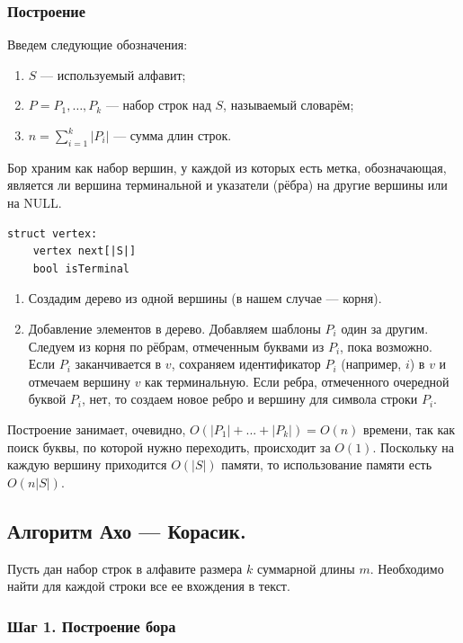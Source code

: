 \subsubsection{Построение}

Введем следующие обозначения:

\begin{enumerate}
    \item $S$ --- используемый алфавит;
    \item $P={P_1,…,P_k}$ --- набор строк над $S$, называемый словарём;
    \item $n = \sum_{i = 1}^k |P_i|$ --- сумма длин строк.
\end{enumerate}

Бор храним как набор вершин, у каждой из которых есть метка, обозначающая, является ли вершина терминальной и указатели (рёбра) на другие вершины или на NULL.

\begin{verbatim}
struct vertex:
    vertex next[|S|] 
    bool isTerminal
\end{verbatim}

\begin{enumerate}
    \item Создадим дерево из одной вершины (в нашем случае --- корня).
    \item Добавление элементов в дерево.
    Добавляем шаблоны $P_i$ один за другим.
    Следуем из корня по рёбрам, отмеченным буквами из $P_i$, пока возможно.
    Если $P_i$ заканчивается в $v$, сохраняем идентификатор $P_i$ (например, $i$) в $v$ и отмечаем вершину $v$ как терминальную.
    Если ребра, отмеченного очередной буквой $P_i$, нет, то создаем новое ребро и вершину для символа строки $P_i$.
\end{enumerate}

Построение занимает, очевидно, $O(|P_1|+...+|P_k|)=O(n)$ времени, так как поиск буквы, по которой нужно переходить, происходит за $O(1)$.
Поскольку на каждую вершину приходится $O(|S|)$ памяти, то использование памяти есть $O(n|S|)$. 

\subsection{Алгоритм Ахо --- Корасик.}

Пусть дан набор строк в алфавите размера $k$ суммарной длины $m$.
Необходимо найти для каждой строки все ее вхождения в текст.

\subsubsection{Шаг 1. Построение бора}

